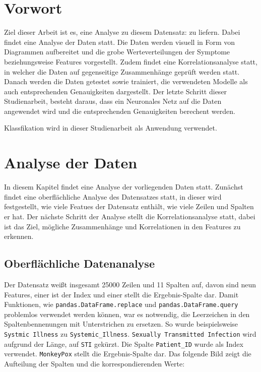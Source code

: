 \documentclass[13pt,a4paper, listof=entryprefix, bibliography=totocnumbered,toc=listofnumbered,lof=listofnumbered]{scrartcl}
\begin{document}

	\section{Vorwort}
		\label{ch:vorwort}

	Ziel dieser Arbeit ist es, eine Analyse zu diesem Datensatz:  zu liefern. Dabei findet eine Analyse der 
	Daten statt. Die Daten werden visuell in Form von Diagrammen aufbereitet und die grobe Werteverteilungen
	der Symptome beziehungsweise Features vorgestellt. Zudem findet eine Korrelationsanalyse statt, in welcher die 
	Daten auf gegenseitige Zusammenhänge geprüft werden statt. Danach werden die Daten getestet sowie trainiert, die
	verwendeten Modelle als auch entsprechenden Genauigkeiten dargestellt. Der letzte Schritt dieser Studienarbeit,
	besteht daraus, dass ein Neuronales Netz auf die Daten angewendet wird und die entsprechenden Genauigkeiten
	berechent werden. 

	Klassfikation wird in dieser Studienarbeit als Anwendung verwendet. 
	

	\section{Analyse der Daten}
		\label{ch:analyse_daten}

	In diesem Kapitel findet eine Analyse der vorliegenden Daten statt. Zunächst findet eine oberflächliche Analyse des Datensatzes statt, in dieser
	wird festgestellt, wie viele Featues der Datensatz enthält, wie viele Zeilen und Spalten er hat. Der nächste Schritt der Analyse stellt die Korrelationsanalyse
	statt, dabei ist das Ziel, mögliche Zusammenhänge und Korrelationen in den Features zu erkennen. 

	\subsection{Oberflächliche Datenanalyse}
		\label{ch:oberflaechliche_analyse}

	Der Datensatz weißt insgesamt 25000 Zeilen und 11 Spalten auf, davon sind 
	neun Features, einer ist der Index und einer stellt die Ergebnis-Spalte dar. Damit Funktionen, wie \lstinline{pandas.DataFrame.replace} und 
	\lstinline{pandas.DataFrame.query} problemlos verwendet werden können, war es notwendig, die Leerzeichen in den Spaltenbennenungen mit Unterstrichen zu ersetzen. 
	So wurde beispielsweise \lstinline{Systmic Illness} zu \lstinline{Systemic_Illness}. \lstinline{Sexually Transmitted Infection} wird aufgrund der Länge, auf
	\lstinline{STI} gekürzt. Die Spalte \lstinline{Patient_ID} wurde als Index verwendet. 
	\lstinline{MonkeyPox} stellt die Ergebnis-Spalte dar. Das folgende Bild zeigt die Aufteilung der Spalten und die korrespondierenden Werte:
\end{document}
